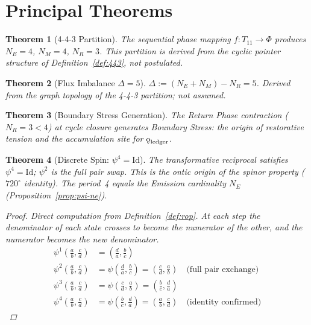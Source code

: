 \documentclass[11pt, letterpaper]{article}
\newcommand{\koppa}{\mathbin{\text{\rm\k{o}}}}
\newcommand{\Tcyc}{T_{11}}
\newcommand{\PhiSet}{\Phi}
\theoremstyle{definition}
\theoremstyle{plain}
\newtheorem{theorem}{Theorem}[section]
\begin{document}
\newpage


\section{Principal Theorems}\label{sec:theorems}

\begin{theorem}[4-4-3 Partition]\label{thm:443}
The sequential phase mapping $f:\Tcyc\to\PhiSet$ produces $N_E=4$, $N_M=4$,
$N_R=3$.  This partition is derived from the cyclic pointer structure of
Definition~\ref{def:443}, not postulated.
\end{theorem}

\begin{theorem}[Flux Imbalance $\Delta=5$]\label{thm:flux}
$\Delta:=(N_E+N_M)-N_R=5$.  Derived from the graph topology of the 4-4-3
partition; not assumed.
\end{theorem}

\begin{theorem}[Boundary Stress Generation]\label{thm:boundary-stress}
The Return Phase contraction ($N_R=3<4$) at cycle closure generates Boundary
Stress: the origin of restorative tension and the accumulation site for
$\koppa_{\mathrm{ledger}}$.
\end{theorem}

\begin{theorem}[Discrete Spin: $\psi^4=\mathrm{Id}$]\label{thm:spin}
The transformative reciprocal satisfies $\psi^4=\mathrm{Id}$; $\psi^2$ is
the full pair swap.  This is the ontic origin of the spinor property
($720^\circ$ identity).  The period~4 equals the Emission cardinality $N_E$
(Proposition~\ref{prop:psi-ne}).
\begin{proof}
Direct computation from Definition~\ref{def:rop}.  At each step the
denominator of each state crosses to become the numerator of the other,
and the numerator becomes the new denominator.
\begin{align*}
\psi^1\!\left(\tfrac{a}{b},\tfrac{c}{d}\right)
  &= \left(\tfrac{d}{a},\tfrac{b}{c}\right) \\
\psi^2\!\left(\tfrac{a}{b},\tfrac{c}{d}\right)
  &= \psi\!\left(\tfrac{d}{a},\tfrac{b}{c}\right)
   = \left(\tfrac{c}{d},\tfrac{a}{b}\right)
   \quad\text{(full pair exchange)} \\
\psi^3\!\left(\tfrac{a}{b},\tfrac{c}{d}\right)
  &= \psi\!\left(\tfrac{c}{d},\tfrac{a}{b}\right)
   = \left(\tfrac{b}{c},\tfrac{d}{a}\right) \\
\psi^4\!\left(\tfrac{a}{b},\tfrac{c}{d}\right)
  &= \psi\!\left(\tfrac{b}{c},\tfrac{d}{a}\right)
   = \left(\tfrac{a}{b},\tfrac{c}{d}\right)
   \quad\text{(identity confirmed)}
\end{align*}
\end{proof}
\end{theorem}
\end{document}
